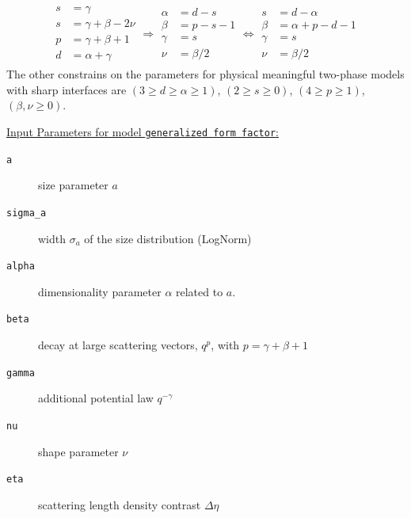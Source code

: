 \begin{align}\label{eq:lesser_generalizedFFparameters}
\begin{array}{rl}
  s &= \gamma \\
 s &= \gamma + \beta -2\nu \\
 p &= \gamma+\beta+1 \\
 d &= \alpha+\gamma
\end{array}
\Rightarrow
\begin{array}{rl}
 \alpha &= d-s \\
 \beta &= p-s-1 \\
 \gamma &= s \\
 \nu &=\beta/2
\end{array}
\Leftrightarrow
\begin{array}{rl}
 s &= d-\alpha \\
 \beta &= \alpha+p-d-1 \\
 \gamma &= s \\
 \nu &=\beta/2
\end{array}
\end{align}
The other constrains on the parameters for physical meaningful two-phase models with sharp interfaces are $(3\geq d\geq \alpha\geq 1)$,  $(2\geq s\geq 0)$, $(4\geq p \geq 1)$, $(\beta,\nu\geq 0)$.

\vspace{5mm}

\uline{Input Parameters for model \texttt{generalized form factor}:}\\
\begin{description}
\item[\texttt{a}] size parameter $a$
\item[\texttt{sigma\_a}] width $\sigma_a$ of the size distribution (LogNorm)
\item[\texttt{alpha}] dimensionality parameter $\alpha$ related to $a$.
\item[\texttt{beta}] decay at large scattering vectors, $q^p$, with $p=\gamma+\beta+1$
\item[\texttt{gamma}] additional potential law $q^{-\gamma}$
\item[\texttt{nu}] shape parameter $\nu$
\item[\texttt{eta}] scattering length density contrast $\Delta\eta$
\end{description}

\vspace{5mm}

